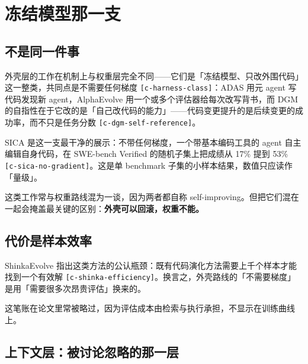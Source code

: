 \section{冻结模型那一支}

\subsection{不是同一件事}

外壳层的工作在机制上与权重层完全不同——它们是「冻结模型、只改外围代码」这一整类，共同点是不需要任何梯度 {\scriptsize\texttt{[c-\hspace{0pt}harness-\hspace{0pt}class]}}：ADAS 用元 agent 写代码发现新 agent，AlphaEvolve 用一个或多个评估器给每次改写背书，而 DGM 的自指性在于它改的是「自己改代码的能力」——代码变更提升的是后续变更的成功率，而不只是任务分数 {\scriptsize\texttt{[c-\hspace{0pt}dgm-\hspace{0pt}self-\hspace{0pt}reference]}}。


SICA 是这一支最干净的展示：不带任何梯度，一个带基本编码工具的 agent 自主编辑自身代码，在 SWE-bench Verified 的随机子集上把成绩从 17\% 提到 53\% {\scriptsize\texttt{[c-\hspace{0pt}sica-\hspace{0pt}no-\hspace{0pt}gradient]}}。这是单 benchmark 子集的小样本结果，数值只应读作「量级」。


这类工作常与权重路线混为一谈，因为两者都自称 self-improving。但把它们混在一起会掩盖最关键的区别：\textbf{外壳可以回滚，权重不能。}


\subsection{代价是样本效率}

ShinkaEvolve 指出这类方法的公认瓶颈：既有代码演化方法需要上千个样本才能找到一个有效解 {\scriptsize\texttt{[c-\hspace{0pt}shinka-\hspace{0pt}efficiency]}}。换言之，外壳路线的「不需要梯度」是用「需要很多次昂贵评估」换来的。


这笔账在论文里常被略过，因为评估成本由检索与执行承担，不显示在训练曲线上。


\subsection{上下文层：被讨论忽略的那一层}

